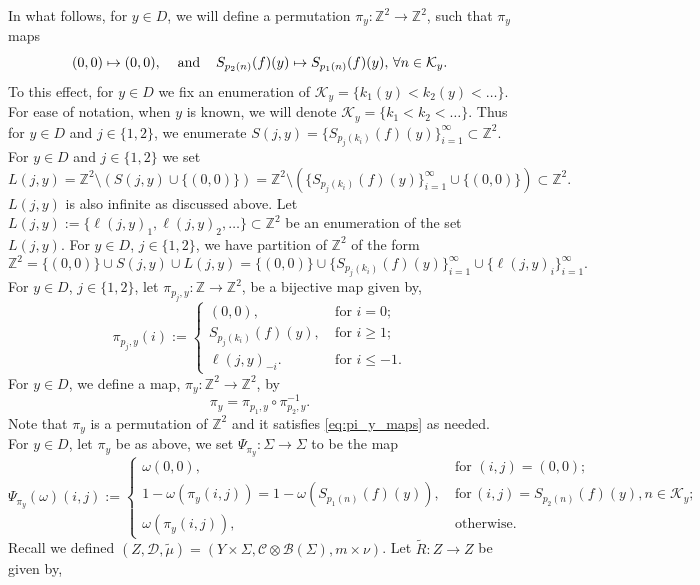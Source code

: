 \documentclass[12pt,reqno]{amsart}
\newcommand{\Z}{\mathbb{Z}}
\newcommand{\B}{\mathcal{B}}
\newcommand{\Tmu}{\widetilde{\mu}}
\theoremstyle{definition}
\begin{document}
In what follows, for $y \in D$, we will define a permutation $\pi_y: \Z^2 \rightarrow \Z^2$, such that $\pi_y$ maps
\begin{equation}\label{eq:pi_y_maps}
    (0,0) \mapsto (0,0), \hspace{4mm} \mathrm{and} \hspace{4mm} S_{p_2(n)} (f) (y) \mapsto S_{p_1(n)} (f) (y),\, \forall n \in \mathcal{K}_y.
\end{equation} To this effect, for $y \in D$ we fix an enumeration of $\mathcal{K}_y = \{k_1(y)<k_2(y)< \ldots\}$. For ease of notation, when $y$ is known, we will denote $\mathcal{K}_y = \{k_1 < k_2 < \ldots\}$. Thus for $y \in D$ and $j\in \{1,2\}$, we enumerate $S(j,y) = \{S_{p_j(k_i)} (f) (y) \}_{i=1}^{\infty} \subset \Z^2$. For $y \in D$ and $j \in \{1,2\}$ we set 
\begin{equation}\label{eq:L_j_y}
    L(j,y) = \Z^2\setminus (S(j,y) \cup \{(0,0)\}) = \Z^2 \setminus (\{S_{p_j(k_i)} (f) (y) \}_{i=1}^{\infty} \cup \{(0,0)\}) \subset \Z^2.
\end{equation} $L(j,y)$ is also infinite as discussed above. Let $L(j,y) := \{\ell(j,y)_1, \ell(j,y)_2,\ldots\} \subset \Z^2$ be an enumeration of the set $L(j,y)$. For $y \in D$, $j \in \{1,2\}$, we have partition of $\Z^2$ of the form
\[
\Z^2 = \{(0,0)\} \cup S(j,y) \cup L(j,y) = \{(0,0)\} \cup \{S_{p_j(k_i)} (f) (y) \}_{i=1}^{\infty} \cup \{\ell(j,y)_i\}_{i=1}^{\infty}.
\] For $y\in D$, $j \in \{1,2\}$, let $\pi_{p_j,y}: \Z \rightarrow \Z^2$, be a bijective map given by,
\begin{equation}\label{eq:pi_p_j_y}
    \pi_{p_j,y}(i):=\begin{cases}
(0,0), &\ \text{for}\,\, i = 0;\\
S_{p_j(k_i)} (f)(y), &\ \text{for}\,\, i \geq 1;\\ 
\ell(j,y)_{-i}. &\ \text{for}\,\, i \leq -1.
\end{cases}
\end{equation} For $y \in D$, we define a map, $\pi_y: \Z^2 \rightarrow \Z^2$, by 
\begin{equation}\label{eq:pi_y}
    \pi_{y} = \pi_{p_1,y} \circ \pi^{-1}_{p_2,y}.
\end{equation} Note that $\pi_y$ is a permutation of $\Z^2$ and it satisfies \eqref{eq:pi_y_maps} as needed. For $y\in D$, let $\pi_y$ be as above, we set $\Psi_{\pi_y}: \Sigma \rightarrow \Sigma$ to be the map
\begin{equation}\label{eq:Psi_pi_y}
    \Psi_{\pi_y} (\omega)(i,j):=\begin{cases}
\omega(0,0), &\ \text{for}\,\, (i,j) = (0,0);\\
1-\omega(\pi_y(i,j)) = 1-\omega(S_{p_1(n)} (f)(y)), &\ \text{for}\, (i,j) = S_{p_2(n)} (f)(y), n \in \mathcal{K}_y ;\\
\omega(\pi_y(i,j)), &\  \text{otherwise}.
\end{cases}
\end{equation} Recall we defined $(Z,\mathcal{D},\Tmu) = (Y \times \Sigma, \mathcal{C} \otimes \B(\Sigma), m \times \nu)$. Let $\widetilde{R}: Z \rightarrow Z$ be given by,
\end{document}
